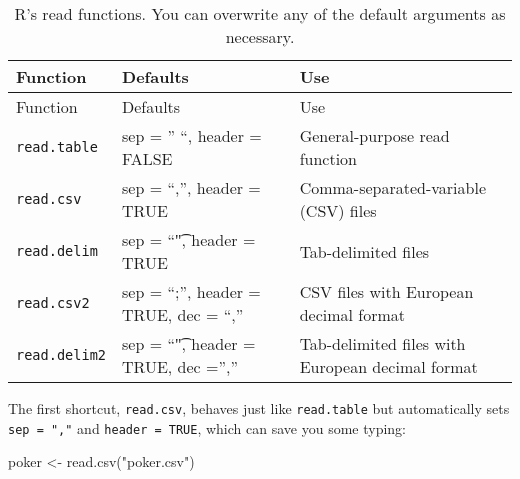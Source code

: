\documentclass[
  letterpaper,
  DIV=11,
  numbers=noendperiod]{scrbook}
\newenvironment{Shaded}{\begin{snugshade}}{\end{snugshade}}
\newcommand{\FunctionTok}[1]{\textcolor[rgb]{0.28,0.35,0.67}{#1}}
\newcommand{\NormalTok}[1]{\textcolor[rgb]{0.00,0.23,0.31}{#1}}
\newcommand{\OtherTok}[1]{\textcolor[rgb]{0.00,0.23,0.31}{#1}}
\newcommand{\StringTok}[1]{\textcolor[rgb]{0.13,0.47,0.30}{#1}}
\begin{document}
\begin{longtable}[]{@{}
  >{\raggedright\arraybackslash}p{}
  >{\raggedright\arraybackslash}p{}
  >{\raggedright\arraybackslash}p{}@{}}
\caption{R's read functions. You can overwrite any of the default
arguments as necessary.}\label{tbl-shortcuts}\tabularnewline
\toprule\noalign{}
\begin{minipage}[b]{\linewidth}\raggedright
Function
\end{minipage} & \begin{minipage}[b]{\linewidth}\raggedright
Defaults
\end{minipage} & \begin{minipage}[b]{\linewidth}\raggedright
Use
\end{minipage} \\
\midrule\noalign{}
\endfirsthead
\toprule\noalign{}
\begin{minipage}[b]{\linewidth}\raggedright
Function
\end{minipage} & \begin{minipage}[b]{\linewidth}\raggedright
Defaults
\end{minipage} & \begin{minipage}[b]{\linewidth}\raggedright
Use
\end{minipage} \\
\midrule\noalign{}
\endhead
\bottomrule\noalign{}
\endlastfoot
\texttt{read.table} & sep = '' ``, header = FALSE & General-purpose read
function \\
\texttt{read.csv} & sep = ``,'', header = TRUE &
Comma-separated-variable (CSV) files \\
\texttt{read.delim} & sep = ``\t", header = TRUE & Tab-delimited
files \\
\texttt{read.csv2} & sep = ``;'', header = TRUE, dec = ``,'' & CSV files
with European decimal format \\
\texttt{read.delim2} & sep = ``\t", header = TRUE, dec ='','' &
Tab-delimited files with European decimal format \\
\end{longtable}

The first shortcut, \texttt{read.csv}, behaves just like
\texttt{read.table} but automatically sets \texttt{sep\ =\ ","} and
\texttt{header\ =\ TRUE}, which can save you some typing:

\begin{Shaded}
\begin{Highlighting}[]
\NormalTok{poker }\OtherTok{\textless{}{-}} \FunctionTok{read.csv}\NormalTok{(}\StringTok{"poker.csv"}\NormalTok{)}
\end{Highlighting}
\end{Shaded}
\end{document}
